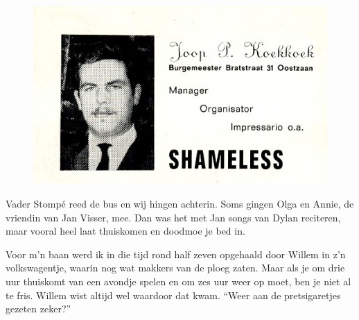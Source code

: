 \documentclass[10pt,twoside, openright]{memoir}
\begin{document}
\begin{figure}
\includegraphics[width=\textwidth]{img/169JoopB}
\end{figure}

Vader Stompé reed de bus en wij hingen achterin. Soms gingen Olga en Annie, de vriendin van Jan Visser, mee. Dan was het met Jan songs van Dylan reciteren, maar vooral heel laat thuiskomen en doodmoe je bed in.

Voor m'n baan werd ik in die tijd rond half zeven opgehaald door Willem in z’n volkswagentje, waarin nog wat makkers van de ploeg zaten. Maar als je om drie uur thuiskomt van een avondje spelen en om zes uur weer op moet, ben je niet al te fris. Willem wist altijd wel waardoor dat kwam. ``Weer aan de pretsigaretjes gezeten zeker?''
\end{document}
